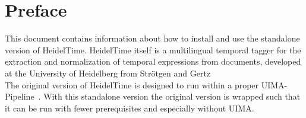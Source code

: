 \section{Preface}\label{sec:Preface}
This document contains information about how to install and use the standalone version of HeidelTime. HeidelTime itself is a multilingual temporal tagger for the extraction and normalization of temporal expressions from documents, developed at the University of Heidelberg from Str\"otgen and Gertz~\cite{StroetgenGertz2010_SemEval, HeidelTime, StroetgenGertz2013_LRE}\\
The original version of HeidelTime is designed to run within a proper UIMA-Pipeline~\cite{UIMA}. With this standalone version the original version is wrapped such that it can be run with fewer prerequisites and especially without UIMA.

